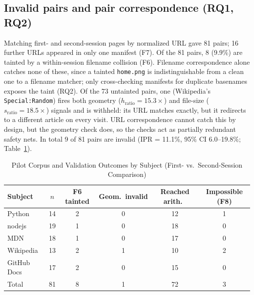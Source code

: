 \documentclass[conference]{IEEEtran}
\begin{document}
\subsection{Invalid pairs and pair correspondence (RQ1, RQ2)}
Matching first- and second-session pages by normalized URL gave 81 pairs; 16 further URLs appeared in only one manifest (F7). Of the 81 pairs, 8 (9.9\%) are tainted by a within-session filename collision (F6). Filename correspondence alone catches none of these, since a tainted \texttt{home.png} is indistinguishable from a clean one to a filename matcher; only cross-checking manifests for duplicate basenames exposes the taint (RQ2). Of the 73 untainted pairs, one (Wikipedia's \texttt{Special:Random}) fires both geometry ($h_{\mathrm{ratio}}=15.3\times$) and file-size ($s_{\mathrm{ratio}}=18.5\times$) signals and is withheld: its URL matches exactly, but it redirects to a different article on every visit. URL correspondence cannot catch this by design, but the geometry check does, so the checks act as partially redundant safety nets. In total 9 of 81 pairs are invalid (IPR = 11.1\%, 95\% CI 6.0--19.8\%; Table~\ref{tab:subject}).

\begin{table}[!t]
\caption{Pilot Corpus and Validation Outcomes by Subject (First- vs.\ Second-Session Comparison)}
\label{tab:subject}
\centering\footnotesize
\begin{tabular}{@{}lccccc@{}}
\toprule
Subject & $n$ & F6 tainted & Geom.\ invalid & Reached arith.\ & Impossible (F8)\\
\midrule
Python & 14 & 2 & 0 & 12 & 1\\
nodejs & 19 & 1 & 0 & 18 & 0\\
MDN & 18 & 1 & 0 & 17 & 0\\
Wikipedia & 13 & 2 & 1 & 10 & 2\\
GitHub Docs & 17 & 2 & 0 & 15 & 0\\
\midrule
Total & 81 & 8 & 1 & 72 & 3\\
\bottomrule
\end{tabular}
\end{table}
\end{document}
